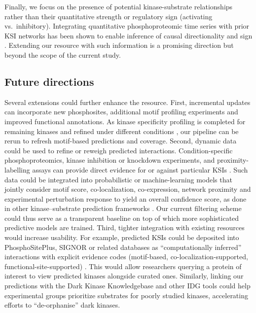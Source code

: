 \documentclass[
  number,
  preprint,
  onecolumn]{elsarticle}
\begin{document}
Finally, we focus on the presence of potential kinase-substrate
relationships rather than their quantitative strength or regulatory sign
(activating vs.~inhibitory). Integrating quantitative phosphoproteomic
time series with prior KSI networks has been shown to enable inference
of causal directionality and sign \citep{Invergo2020-kl}. Extending our
resource with such information is a promising direction but beyond the
scope of the current study.

\subsection{Future directions}\label{future-directions}

Several extensions could further enhance the resource. First,
incremental updates can incorporate new phosphosites, additional motif
profiling experiments and improved functional annotations. As kinase
specificity profiling is completed for remaining kinases and refined
under different conditions \citep{Johnson2023-ai, Yaron-Barir2024-lv},
our pipeline can be rerun to refresh motif-based predictions and
coverage. Second, dynamic data could be used to refine or reweigh
predicted interactions. Condition-specific phosphoproteomics, kinase
inhibition or knockdown experiments, and proximity-labelling assays can
provide direct evidence for or against particular KSIs
\citep{Ochoa2020-og, Miller2008-ey, Gerritsen2021-cr}. Such data could
be integrated into probabilistic or machine-learning models that jointly
consider motif score, co-localization, co-expression, network proximity
and experimental perturbation response to yield an overall confidence
score, as done in other kinase--substrate prediction frameworks
\citep{Ochoa2020-og, Yaron-Barir2024-lv, Miller2008-ey, Obenauer2003-fc, Licata2020-fm}.
Our current filtering scheme could thus serve as a transparent baseline
on top of which more sophisticated predictive models are trained. Third,
tighter integration with existing resources would increase usability.
For example, predicted KSIs could be deposited into PhosphoSitePlus,
SIGNOR or related databases as ``computationally inferred'' interactions
with explicit evidence codes (motif-based, co-localization-supported,
functional-site-supported)
\citep{Hornbeck2015-dg, Huang2018-bq, Licata2020-fm}. This would allow
researchers querying a protein of interest to view predicted kinases
alongside curated ones. Similarly, linking our predictions with the Dark
Kinase Knowledgebase and other IDG tools \citep{Berginski2021-so} could
help experimental groups prioritize substrates for poorly studied
kinases, accelerating efforts to ``de-orphanise'' dark kinases.
\end{document}
